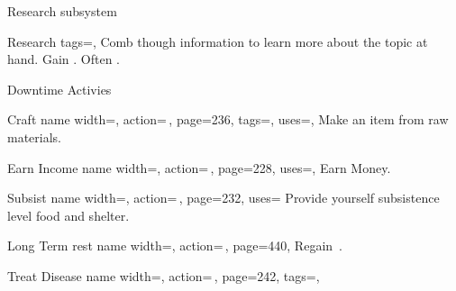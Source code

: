 \begin{PageFront}
\begin{Tables}{\frontTableHeight}
\begin{Table}{Research subsystem}
\begin{entry}{Research}
{                tags=\Concentrate,
            }
                Comb though information to learn more about the topic at hand. Gain  . Often \Linguistic.\\
            \end{entry}
        \end{Table}
    \end{Tables}%
    \begin{Tables}{\frontTableHeight}
        \begin{Table}{Downtime Activies}
            \begin{entry}{Craft}{%
                name width=\activityLength,%
                action=\,\TimeDaily,
                page=236,
                tags=\Manipulate,
                uses={\Crafting[tags={T}]},
            }
                Make an item from raw materials.\hfill {}
            \end{entry}
            \begin{entry}{Earn Income}{%
                name width=\activityLength,%
                action=\,\TimeDaily,
                page=228,
                uses={},
            }
                Earn Money.
            \end{entry}
            \begin{entry}{Subsist}{%
                name width=\activityLength,%
                action=\,,
                page=232,
                uses={}
            }
                Provide yourself subsistence level food and shelter.\hfill {}
            \end{entry}
            \begin{entry}{Long Term rest}{%
                name width=\activityLength,%
                action=\,,
                page=440,
            }
                Regain \,\HPs. \quad{}
            \end{entry}
            \begin{entry}{Treat Disease}{%
                name width=\activityLength,%
                action=\,,
                page=242,
                tags=\Manipulate,
}
\end{entry}
\end{Table}
\end{Tables}
\end{PageFront}
